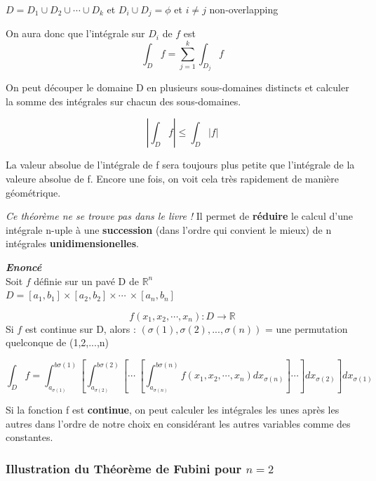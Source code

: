 \begin{myprop}
$D= D_1 \cup D_2 \cup \cdots \cup D_k$ et $D_i \cup D_j = \phi$ et $i\neq j$ non-overlapping

On aura donc que l'intégrale sur $D_i$ de $f$ est
\[\int_D f=\sum_{j=1}^k \int_{D_j} f\]

On peut découper le domaine D en plusieurs sous-domaines distincts et calculer la somme des intégrales sur chacun des sous-domaines.
\end{myprop}

\begin{myprop}
\[\left|\int_D f \right| \le \int_D|f|\]

La valeur absolue de l'intégrale de f sera toujours plus petite que l'intégrale de la valeure absolue de f. Encore une fois, on voit cela très rapidement de manière géométrique.
\end{myprop}

\begin{myprop}
\textit{Ce théorème ne se trouve pas dans le livre !}
Il permet de \textbf{réduire} le calcul d'une intégrale n-uple à une \textbf{succession} (dans l'ordre qui convient le mieux) de n intégrales \textbf{unidimensionelles}.

\textit{\textbf{Enoncé}} \\Soit $f$ définie sur un pavé D de $\mathbb{R}^n$\\
$D=[a_1,b_1]\times[a_2,b_2]\times \cdots\ \times[a_n,b_n]$

\[f(x_1,x_2,\cdots,x_n) : D\to\mathbb{R}\]
Si $f$ est continue sur D, alors : $(\sigma(1),\sigma(2),...,\sigma(n)) $ = une permutation quelconque de (1,2,...,n)

$$
\int_D f= \int_{a_{\sigma(1)}}^{b{\sigma(1)}}
\left[
\int_{a_{\sigma(2)}}^{b{\sigma(2)}}
\left[ \cdots\ \left[
\int_{a_{\sigma(n)}}^{b{\sigma(n)}}
f(x_1,x_2,\cdots,x_n )dx_{\sigma(n)}
\right]\cdots\right]
dx_{\sigma(2)} \right] dx_{\sigma(1)}
$$

Si la fonction f est \textbf{continue}, on peut calculer les intégrales les unes après les autres dans l'ordre de notre choix en considérant les autres variables comme des constantes.
\end{myprop}




\subsubsection{Illustration du Théorème de Fubini pour $n = 2$}




